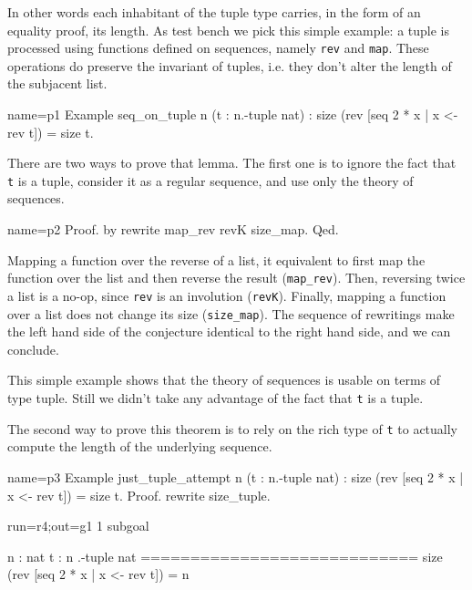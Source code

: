 In other words each inhabitant of the tuple type carries,
in the form of an equality proof, its length.  As test bench
we pick this simple example: a tuple is processed using
functions defined on sequences, namely \lstinline/rev/ and
\lstinline/map/.  These operations do preserve the invariant of
tuples, i.e. they don't alter the length of the subjacent list.

\begin{coq}{name=p1}{}
Example seq_on_tuple n (t : n.-tuple nat) :
  size (rev [seq 2 * x | x <- rev t]) = size t.
\end{coq}

There are two ways to prove that lemma.  The first one is
to ignore the fact that \lstinline/t/ is a tuple, consider it
as a regular sequence, and use only the theory of sequences.

\begin{coq}{name=p2}{}
Proof. by rewrite map_rev revK size_map. Qed.
\end{coq}

Mapping a function over the reverse of a list, it equivalent to
first map the function over the list and then reverse the result
(\lstinline/map_rev/).  Then, reversing twice a list is a no-op, since
\lstinline/rev/ is an involution
(\lstinline/revK/).  Finally, mapping a function over a list does not
change its size (\lstinline/size_map/).  The sequence of rewritings
make the left hand side of the conjecture identical to the right hand
side, and we can conclude.

This simple example shows that the theory of sequences is usable
on terms of type tuple.  Still we didn't take any advantage of
the fact that  \lstinline/t/ is a tuple.

The second way to prove this theorem is to rely on the rich type
of \lstinline/t/ to actually compute the length of the underlying 
sequence.

\begin{coq}{name=p3}{}
Example just_tuple_attempt n (t : n.-tuple nat) :
  size (rev [seq 2 * x | x <- rev t]) = size t.
Proof. rewrite size_tuple.
\end{coq}
\begin{coqout}{run=r4;out=g1}{}
1 subgoal

 n : nat
 t : n .-tuple nat
 ============================
 size (rev [seq 2 * x | x <- rev t]) = n
\end{coqout}

